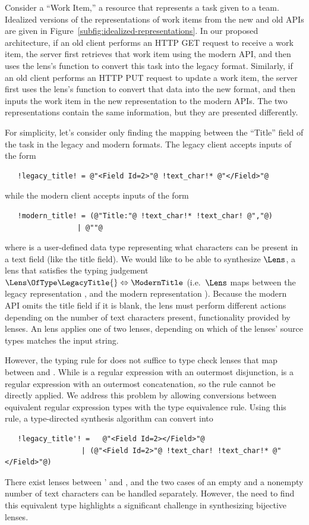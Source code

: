 \documentclass[sigplan,acmsmall]{acmart}
\begin{document}
Consider a ``Work Item,'' a resource that represents a task given to a
team.  Idealized versions of the representations of work items from the new and
old APIs are given in Figure~\ref{subfig:idealized-representations}.  In our
proposed architecture, if an old
client performs an HTTP GET request to receive a work item, the server first
retrieves that work item using the modern API, and then uses the
lens's \PutLeft{} function to convert this task into the legacy format.  Similarly,
if an old client performs an HTTP PUT request to update a work item, the server
first uses the lens's 
\PutRight{} function to convert that data into the
new format, and then inputs the work item in the new representation to the modern APIs.  The two
representations contain the same information, but they are presented
differently.

For simplicity, let's consider only finding the mapping between the ``Title''
field of the task in the legacy and modern formats.
The legacy client accepts inputs of the form 
%
\begin{lstlisting}
   !legacy_title! = @"<Field Id=2>"@ !text_char!* @"</Field>"@
\end{lstlisting}
while the modern client accepts inputs of the form
\begin{lstlisting}
   !modern_title! = (@"Title:"@ !text_char!* !text_char! @","@)
                 | @""@
\end{lstlisting}
%
where \TextChar{} is a user-defined data type representing what characters can
be present in a text field (like the title field).
We would like to be able to synthesize $\Lens$, a lens that satisfies the
typing judgement $\Lens \OfType \LegacyTitle{} \Leftrightarrow \ModernTitle$
(i.e.\ $\Lens$ maps between the legacy representation \LegacyTitle{}, and the modern
representation \ModernTitle{}).
Because the modern API omits the title field if it is blank, the lens must
perform different 
actions depending on the number of text characters present,
functionality provided by \OrLens{} lenses.
An \OrLens{} lens applies one of two lenses, depending on which of the lenses'
source types matches the input string.

However, the typing rule for \OrLens{} does not suffice to type check lenses
that map between \LegacyTitle{} and \ModernTitle{}.  While
 is a regular expression with an
outermost disjunction, 
is a regular expression with an outermost concatenation, so the rule cannot be
directly applied.
We address this problem by allowing conversions between equivalent
regular expression types with the type equivalence rule.
Using this rule, a type-directed synthesis algorithm can convert
\LegacyTitle{} into
%
\begin{lstlisting}
   !legacy_title'! =   @"<Field Id=2></Field>"@
                  | (@"<Field Id=2>"@ !text_char! !text_char!* @"</Field>"@)
\end{lstlisting}
%
There exist \OrLens{} lenses between \LegacyTitle{}' and \ModernTitle{}, and the two cases of an empty
and a nonempty number of text characters can be handled separately.  However,
the need to find this equivalent type highlights a significant challenge in
synthesizing bijective lenses.
\end{document}
